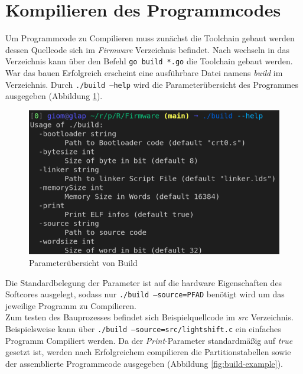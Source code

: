     \section{Kompilieren des Programmcodes}
        Um Programmcode zu Compilieren muss zunächst die Toolchain gebaut werden
        dessen Quellcode sich im \textit{Firmware} Verzeichnis befindet.
        Nach wechseln in das Verzeichnis kann über den Befehl \texttt{go build *.go}
        die Toolchain gebaut werden. War das bauen Erfolgreich erscheint
        eine ausführbare Datei namens \textit{build} im Verzeichnis.
        Durch \texttt{./build --help} wird die Parameterübersicht des Programmes
        ausgegeben (Abbildung \ref{fig:build-help}).

        \begin{figure}[H]
            \centering
            \includegraphics[scale=1]{img/build_help.png}
            \caption{Parameterübersicht von Build}
            \label{fig:build-help}
        \end{figure}
        Die Standardbelegung der Parameter ist auf die hardware Eigenschaften des
        Softcores ausgelegt, sodass nur \texttt{./build --source=PFAD} benötigt wird
        um das jeweilige Programm zu Compilieren.
        \\
        Zum testen des Bauprozesses befindet sich Beispielquellcode im
        \textit{src} Verzeichnis.
        Beispielsweise kann über \texttt{./build --source=src/lightshift.c}
        ein einfaches Programm Compiliert werden. Da der \textit{Print}-Parameter
        standardmäßig auf \textit{true} gesetzt ist, werden nach Erfolgreichem
        compilieren die Partitionstabellen sowie der assemblierte Programmcode
        ausgegeben (Abbildung \ref{fig:build-example}).


